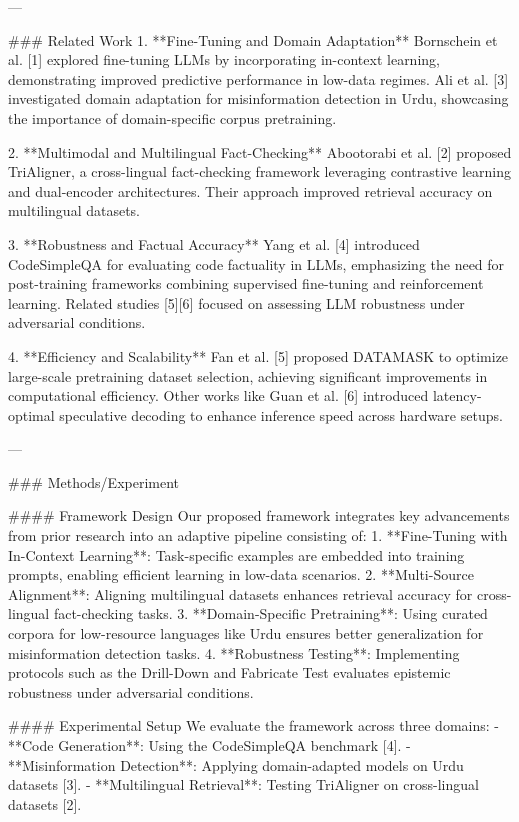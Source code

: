 ---

### Related Work  
1. **Fine-Tuning and Domain Adaptation**  
Bornschein et al. [1] explored fine-tuning LLMs by incorporating in-context learning, demonstrating improved predictive performance in low-data regimes. Ali et al. [3] investigated domain adaptation for misinformation detection in Urdu, showcasing the importance of domain-specific corpus pretraining.

2. **Multimodal and Multilingual Fact-Checking**  
Abootorabi et al. [2] proposed TriAligner, a cross-lingual fact-checking framework leveraging contrastive learning and dual-encoder architectures. Their approach improved retrieval accuracy on multilingual datasets. 

3. **Robustness and Factual Accuracy**  
Yang et al. [4] introduced CodeSimpleQA for evaluating code factuality in LLMs, emphasizing the need for post-training frameworks combining supervised fine-tuning and reinforcement learning. Related studies [5][6] focused on assessing LLM robustness under adversarial conditions.

4. **Efficiency and Scalability**  
Fan et al. [5] proposed DATAMASK to optimize large-scale pretraining dataset selection, achieving significant improvements in computational efficiency. Other works like Guan et al. [6] introduced latency-optimal speculative decoding to enhance inference speed across hardware setups.

---

### Methods/Experiment  

#### Framework Design  
Our proposed framework integrates key advancements from prior research into an adaptive pipeline consisting of:  
1. **Fine-Tuning with In-Context Learning**: Task-specific examples are embedded into training prompts, enabling efficient learning in low-data scenarios.  
2. **Multi-Source Alignment**: Aligning multilingual datasets enhances retrieval accuracy for cross-lingual fact-checking tasks.  
3. **Domain-Specific Pretraining**: Using curated corpora for low-resource languages like Urdu ensures better generalization for misinformation detection tasks.  
4. **Robustness Testing**: Implementing protocols such as the Drill-Down and Fabricate Test evaluates epistemic robustness under adversarial conditions.  

#### Experimental Setup  
We evaluate the framework across three domains:  
- **Code Generation**: Using the CodeSimpleQA benchmark [4].  
- **Misinformation Detection**: Applying domain-adapted models on Urdu datasets [3].  
- **Multilingual Retrieval**: Testing TriAligner on cross-lingual datasets [2].  

